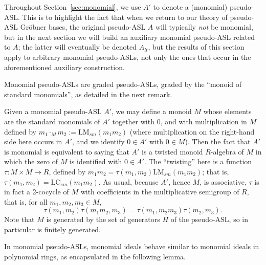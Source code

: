 \documentclass[11pt,reqno]{amsart}
\newcommand{\lmsm}{\text{LM}_{sm}}
\newcommand{\lcsm}{\text{LC}_{sm}}
\theoremstyle{definition}
\numberwithin{equation}{section}
\begin{document}
\begin{convention}
Throughout Section~\ref{sec:monomial}, we use $A'$ to denote a (monomial) pseudo-ASL. This is to highlight the fact that when we return to our theory of pseudo-ASL Gröbner bases, the original pseudo-ASL $A$ will typically \emph{not} be monomial, but in the next section we will build an auxiliary monomial pseudo-ASL related to $A$; the latter will eventually be denoted $A_{lt}$, but the results of this section apply to arbitrary monomial pseudo-ASLs, not only the ones that occur in the aforementioned auxiliary construction.
\end{convention}

Monomial pseudo-ASLs are graded pseudo-ASLs, graded by the ``monoid of standard monomials'', as detailed in the next remark.

\begin{remark} \label{rmk:semigroup}
Given a monomial pseudo-ASL $A'$, %
we may define a monoid $M$ whose elements are the standard monomials of $A'$ together with 0, and with multiplication in $M$ defined by $m_1 \cdot_M m_2 := \lmsm(m_1 m_2)$ (where multiplication on the right-hand side here occurs in $A'$, and we identify $0 \in A'$ with $0 \in M$). Then the fact that $A'$ is monomial is equivalent to saying that $A'$ is a twisted monoid $R$-algebra of $M$ in which the zero of $M$ is identified with $0 \in A'$. The ``twisting'' here is a function $\tau \colon M \times M \to R$, defined by $m_1 m_2 = \tau(m_1, m_2) \lmsm(m_1 m_2)$; that is, $\tau(m_1, m_2) = \lcsm(m_1 m_2)$. As usual, because $A'$,  hence $M$, is associative, $\tau$ is in fact a 2-cocycle of $M$ with coefficients in the multiplicative semigroup of $R$, that is, for all $m_1, m_2, m_3 \in M$,
\[
\tau(m_1, m_2) \tau(m_1 m_2, m_3) = \tau(m_1, m_2 m_3) \tau(m_2, m_3).
\]
Note that $M$ is generated by the set of generators $H$ of the pseudo-ASL, so in particular is finitely generated.
\end{remark}

In monomial pseudo-ASLs, monomial ideals behave similar to monomial ideals in polynomial rings, as encapsulated in the following lemma. 
\end{document}
